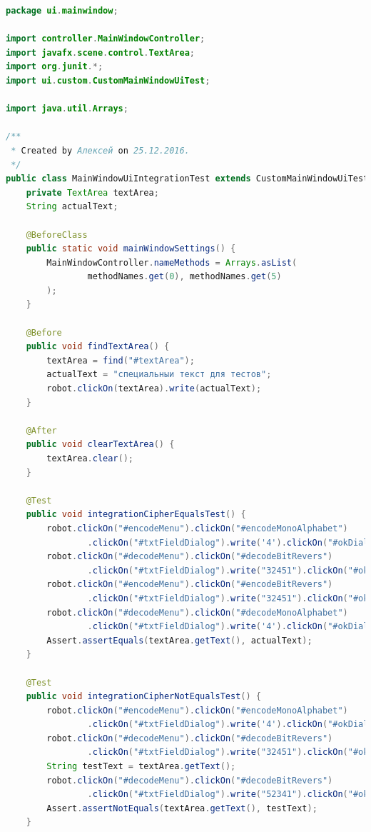 \documentclass[a4paper,12pt]{article}
\begin{document}
\begin{lstlisting}[language=java, caption=код модуля MainWindowUiIntegrationTest.java]
package ui.mainwindow;

import controller.MainWindowController;
import javafx.scene.control.TextArea;
import org.junit.*;
import ui.custom.CustomMainWindowUiTest;

import java.util.Arrays;

/**
 * Created by Алексей on 25.12.2016.
 */
public class MainWindowUiIntegrationTest extends CustomMainWindowUiTest {
    private TextArea textArea;
    String actualText;

    @BeforeClass
    public static void mainWindowSettings() {
        MainWindowController.nameMethods = Arrays.asList(
                methodNames.get(0), methodNames.get(5)
        );
    }

    @Before
    public void findTextArea() {
        textArea = find("#textArea");
        actualText = "специальныи текст для тестов";
        robot.clickOn(textArea).write(actualText);
    }

    @After
    public void clearTextArea() {
        textArea.clear();
    }

    @Test
    public void integrationCipherEqualsTest() {
        robot.clickOn("#encodeMenu").clickOn("#encodeMonoAlphabet")
                .clickOn("#txtFieldDialog").write('4').clickOn("#okDialog");
        robot.clickOn("#decodeMenu").clickOn("#decodeBitRevers")
                .clickOn("#txtFieldDialog").write("32451").clickOn("#okDialog");
        robot.clickOn("#encodeMenu").clickOn("#encodeBitRevers")
                .clickOn("#txtFieldDialog").write("32451").clickOn("#okDialog");
        robot.clickOn("#decodeMenu").clickOn("#decodeMonoAlphabet")
                .clickOn("#txtFieldDialog").write('4').clickOn("#okDialog");
        Assert.assertEquals(textArea.getText(), actualText);
    }

    @Test
    public void integrationCipherNotEqualsTest() {
        robot.clickOn("#encodeMenu").clickOn("#encodeMonoAlphabet")
                .clickOn("#txtFieldDialog").write('4').clickOn("#okDialog");
        robot.clickOn("#decodeMenu").clickOn("#decodeBitRevers")
                .clickOn("#txtFieldDialog").write("32451").clickOn("#okDialog");
        String testText = textArea.getText();
        robot.clickOn("#decodeMenu").clickOn("#decodeBitRevers")
                .clickOn("#txtFieldDialog").write("52341").clickOn("#okDialog");
        Assert.assertNotEquals(textArea.getText(), testText);
    }


\end{lstlisting}
\end{document}
